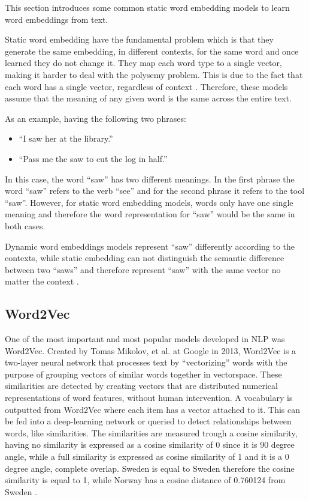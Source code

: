     \par This section introduces some common static word embedding models to learn word embeddings from text.


    \par Static word embedding have the fundamental problem which is that they generate the same embedding, in different contexts, for the same word and once learned they do not change it. They map each word type to a single vector, making it harder to deal with the polysemy problem. This is due to the fact that each word has a single vector, regardless of context \cite{Mikolov2013}. Therefore, these models assume that the meaning of any given word is the same across the entire text.
   

    \par As an example, having the following two phrases:

    \begin{itemize}
        \item ``I saw her at the library.”
        \item ``Pass me the saw to cut the log in half.”
    \end{itemize}

    \par In this case, the word ``saw” has two different meanings. In the first phrase the word ``saw” refers to the verb ``see” and for the second phrase it refers to the tool ``saw”. However, for static word embedding models, words only have one single meaning and therefore  the word representation for \enquote{saw} would be the same in both cases.

    Dynamic word embeddings models represent ``saw” differently according to the contexts, while static embedding can not distinguish the semantic difference between two ``saws” and therefore represent ``saw” with the same vector no matter the context \cite{Wang2020} \cite{Batista2018}.
\newpage
   
        \subsection{Word2Vec}

        One of the most important and most popular models developed in NLP was Word2Vec. Created by Tomas Mikolov, et al. \cite{Mikolov2013} at Google in 2013, Word2Vec is a two-layer neural network that processes text by \enquote{vectorizing} words with the purpose of grouping vectors of similar words together in vectorspace. These similarities are detected by creating vectors that are distributed numerical representations of word features, without human intervention. A vocabulary is outputted from Word2Vec where each item has a vector attached to it. This can be fed into a deep-learning network or queried to detect relationships between words, like similarities. The similarities are measured trough a cosine similarity, having no similarity is expressed as a cosine similarity of 0 since it is 90 degree angle, while a full similarity is expressed as cosine similarity of 1 and it is a 0 degree angle, complete overlap. Sweden is equal to Sweden therefore the cosine similarity is equal to 1, while Norway has a cosine distance of 0.760124 from Sweden \cite{Wiki}.
        
